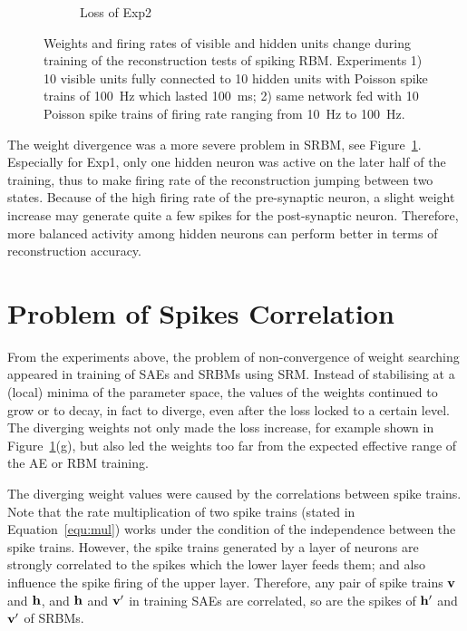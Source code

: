 \begin{figure}
\begin{subfigure}[t]{0.45\textwidth}
		\caption{Loss of Exp2}
	\end{subfigure}
	\caption{Weights and firing rates of visible and hidden units change during training of the reconstruction tests of spiking RBM. 
		Experiments 1) 10 visible units fully connected to 10 hidden units with Poisson spike trains of 100~Hz which lasted 100~ms; 2) same network fed with 10 Poisson spike trains of firing rate ranging from 10~Hz to 100~Hz.}
\label{fig:srbm_orig}
\end{figure}

The weight divergence was a more severe problem in SRBM, see Figure~\ref{fig:srbm_orig}.
Especially for Exp1, only one hidden neuron was active on the later half of the training, thus to make firing rate of the reconstruction jumping between two states.
Because of the high firing rate of the pre-synaptic neuron, a slight weight increase may generate quite a few spikes for the post-synaptic neuron.
Therefore, more balanced activity among hidden neurons can perform better in terms of reconstruction accuracy.

\section{Problem of Spikes Correlation}
\label{sec:problem}
From the experiments above, the problem of non-convergence of weight searching appeared in training of SAEs and SRBMs using SRM.
Instead of stabilising at a (local) minima of the parameter space, the values of the weights continued to grow or to decay, in fact to diverge, even after the loss locked to a certain level.
The diverging weights not only made the loss increase, for example shown in Figure~\ref{fig:srbm_orig}(g), but also led the weights too far from the expected effective range of the AE or RBM training.

The diverging weight values were caused by the correlations between spike trains.
Note that the rate multiplication of two spike trains (stated in Equation~\ref{equ:mul}) works under the condition of the independence between the spike trains.
However, the spike trains generated by a layer of neurons are strongly correlated to the spikes which the lower layer feeds them; and also influence the spike firing of the upper layer.
Therefore, any pair of spike trains $\bf{v}$ and $\bf{h}$, and $\bf{h}$ and $\bf{v'}$ in training SAEs are correlated, so are the spikes of $\bf{h'}$ and $\bf{v'}$ of SRBMs.


